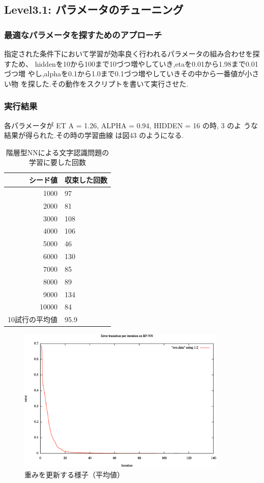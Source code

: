 \subsection{Level3.1: パラメータのチューニング}%
\subsubsection{最適なパラメータを探すためのアプローチ}
指定された条件下において学習が効率良く行われるパラメータの組み合わせを探
すため、
hiddenを10から100まで10づつ増やしていき,etaを0.01から1.98まで0.01づつ増
やし,alphaを0.1から1.0まで0.1づつ増やしていきその中から一番値が小さい物
を探した.その動作をスクリプトを書いて実行させた.

\subsubsection{実行結果}
各パラメータが ET A = 1.26, ALPHA = 0.94, HIDDEN = 16 の時, 3 のよ
うな結果が得られた.その時の学習曲線 は図43 のようになる.
\begin{table}[htb]
 \begin{center}
  \caption{階層型NNによる文字認識問題の学習に要した回数}
  \label{table:level3}
  \begin{tabular}[htb]{r|l} \hline
   シード値 & 収束した回数 \\ \hline \hline
   1000 & 97 \\ \hline
   2000 & 81 \\ \hline
   3000 & 108 \\ \hline
   4000 & 106 \\ \hline
   5000 & 46 \\ \hline
   6000 & 130 \\ \hline
   7000 & 85 \\ \hline
   8000 & 89 \\ \hline
   9000 & 134 \\ \hline
   10000 & 84 \\ \hline \hline
   10試行の平均値 & 95.9 \\ \hline
  \end{tabular}
 \end{center}
\end{table}

\begin{figure}[h]
 \begin{center}
  \includegraphics[width=10.0cm]{ave.eps}
  \caption{重みを更新する様子（平均値）}
  \label{fig:level2}
 \end{center}
\end{figure}
\newpage


